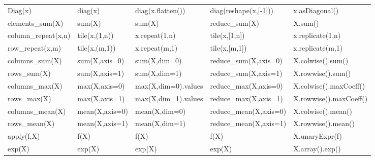 \documentclass{article}
\begin{document}
\begin{table*}[htb]
\begin{tabular}{ p{2.2cm}|p{2.6cm}p{2.6cm}p{2.6cm}p{3.6cm} }
\textsf{Diag(x)}               & \textsf{diag(x)}                & \textsf{diag(x.flatten())}       & \textsf{diag(reshape(x,[-1]))}       & \textsf{x.asDiagonal()}                  \\
\textsf{elements\_sum(X)}      & \textsf{sum(X)}                 & \textsf{sum(X)}                  & \textsf{reduce\_sum(X)}              & \textsf{X.sum()}                         \\
\textsf{column\_repeat(x,n)}   & \textsf{tile(x,(1,n))}          & \textsf{x.repeat(1,n)}           & \textsf{tile(x,[1,n])}               & \textsf{x.replicate(1,n)}               \\
\textsf{row\_repeat(x,m)}      & \textsf{tile(x,(m,1))}          & \textsf{x.repeat(m,1)}           & \textsf{tile(x,[m,1])}               & \textsf{x.replicate(m,1)}               \\
\textsf{columns\_sum(X)}       & \textsf{sum(X,axis=0)}          & \textsf{sum(X,dim=0)}            & \textsf{reduce\_sum(X,axis=0)}       & \textsf{X.colwise().sum()}               \\
\textsf{rows\_sum(X)}          & \textsf{sum(X,axis=1)}          & \textsf{sum(X,dim=1)}            & \textsf{reduce\_sum(X,axis=1)}       & \textsf{X.rowwise().sum()}               \\
\textsf{columns\_max(X)}       & \textsf{max(X,axis=0)}          & \textsf{max(X,dim=0).values}     & \textsf{reduce\_max(X,axis=0)}       & \textsf{X.colwise().maxCoeff()}          \\
\textsf{rows\_max(X)}          & \textsf{max(X,axis=1)}          & \textsf{max(X,dim=1).values}     & \textsf{reduce\_max(X,axis=1)}       & \textsf{X.rowwise().maxCoeff()}          \\
\textsf{columns\_mean(X)}      & \textsf{mean(X,axis=0)}         & \textsf{mean(X,dim=0)}           & \textsf{reduce\_mean(X,axis=0)}      & \textsf{X.colwise().mean()}              \\
\textsf{rows\_mean(X)}         & \textsf{mean(X,axis=1)}         & \textsf{mean(X,dim=1)}           & \textsf{reduce\_mean(X,axis=1)}      & \textsf{X.rowwise().mean()}              \\
\textsf{apply(f,X)}            & \textsf{f(X)}                   & \textsf{f(X)}                    & \textsf{f(X)}                        & \textsf{X.unaryExpr(f)}                  \\
\textsf{exp(X)}                & \textsf{exp(X)}                 & \textsf{exp(X)}                  & \textsf{exp(X)}                      & \textsf{X.array().exp()}                 \\

\end{tabular}
\end{table*}
\end{document}
